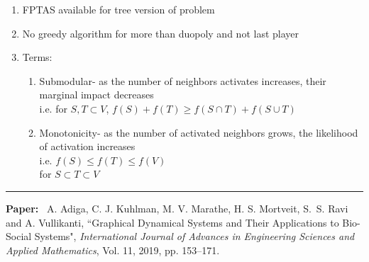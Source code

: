 \documentclass[11pt]{article}
\begin{document}
\begin{enumerate}
    \item FPTAS available for tree version of problem
    
    \item No greedy algorithm for more than duopoly and not last player
    
    \item Terms: 
    \begin{enumerate}
    
    \item Submodular- as the number of neighbors activates increases, their marginal impact decreases
    \\ i.e. for $S,T \subset V$, $f(S) + f(T) \geq f(S \cap T) + f(S \cup T)$
    
    \item Monotonicity- as the number of activated neighbors grows, the likelihood of activation increases
    \\ i.e. $f(S) \leq f(T) \leq f(V)$ \\ for $S \subset T \subset V$
    
    \end{enumerate}
    
\end{enumerate}
\smallskip
\noindent
\rule{\textwidth}{0.01in}

\clearpage

\noindent
\textbf{Paper:}~
A. Adiga, C. J. Kuhlman, M. V. Marathe, H. S. Mortveit,
S.~S. Ravi and A. Vullikanti, ``Graphical Dynamical Systems and Their
Applications to Bio-Social Systems", \emph{International Journal of Advances
in Engineering Sciences and Applied Mathematics}, Vol. 11, 2019, pp. 153--171.
\end{document}
